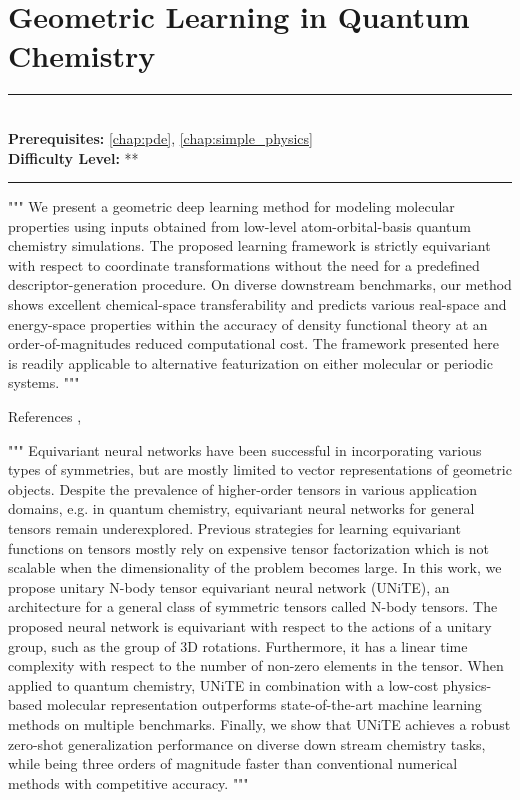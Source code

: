 \documentclass[book.tex]{subfiles}
\begin{document}
\chapter{Geometric Learning in Quantum Chemistry}
\label{chap:geometric_quantum}
\noindent\rule{11cm}{0.4pt} \\
\textbf{Prerequisites:} \autoref{chap:pde}, \autoref{chap:simple_physics} \\
\textbf{Difficulty Level:} ** \\
\noindent\rule{11cm}{0.4pt}
\vspace{5mm}


"""
We present a geometric deep learning method for modeling molecular properties using inputs obtained from low-level atom-orbital-basis quantum chemistry simulations. The proposed learning framework is strictly equivariant with respect to coordinate transformations without the need for a predefined descriptor-generation procedure. On diverse downstream benchmarks, our method shows excellent chemical-space transferability and predicts various real-space and energy-space properties within the accuracy of density functional theory at an order-of-magnitudes reduced computational cost. The framework presented here is readily applicable to alternative featurization on either molecular or periodic systems.
"""

References \cite{qiao2020orbnet}, \cite{qiao2021unite}

"""
Equivariant neural networks have been successful in incorporating various types of symmetries, but are mostly limited to vector representations of geometric objects. Despite the prevalence of higher-order tensors in various application domains, e.g. in quantum chemistry, equivariant neural networks for general tensors remain underexplored. Previous strategies for learning equivariant functions on tensors mostly rely on expensive tensor factorization which is not scalable when the dimensionality of the problem becomes large. In this work, we propose unitary N-body tensor equivariant neural network (UNiTE), an architecture for a general class of symmetric tensors called N-body tensors. The proposed neural network is equivariant with respect to the actions of a unitary group, such as the group of 3D rotations. Furthermore, it has a linear time complexity with respect to the number of non-zero elements in the tensor. When applied to quantum chemistry, UNiTE in combination with a low-cost physics-based molecular representation outperforms state-of-the-art machine learning methods on multiple benchmarks. Finally, we show that UNiTE achieves a robust zero-shot generalization performance on diverse down stream chemistry tasks, while being three orders of magnitude faster than conventional numerical methods with competitive accuracy.
"""
\end{document}
